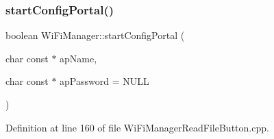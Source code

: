 \subsubsection{\texorpdfstring{start\+Config\+Portal()}{startConfigPortal()}\hspace{0.1cm}{\footnotesize\ttfamily [2/2]}}
{\footnotesize\ttfamily boolean Wi\+Fi\+Manager\+::start\+Config\+Portal (\begin{DoxyParamCaption}\item[{char const $\ast$}]{ap\+Name,  }\item[{char const $\ast$}]{ap\+Password = {\ttfamily NULL} }\end{DoxyParamCaption})}



Definition at line 160 of file Wi\+Fi\+Manager\+Read\+File\+Button.\+cpp.


